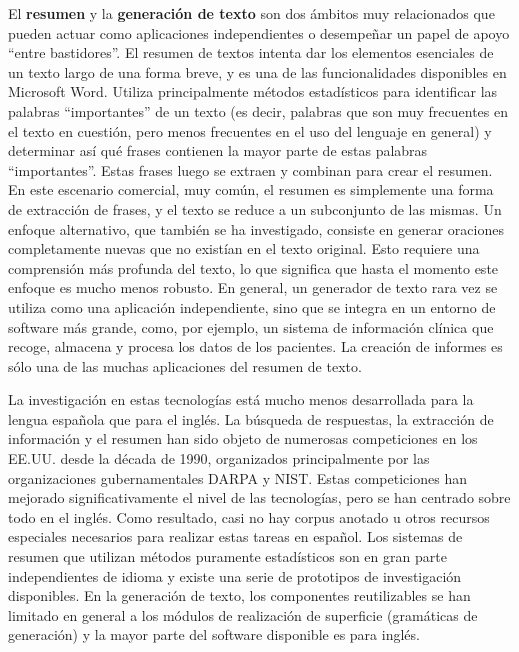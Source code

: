 \begin{multicols}{2}

El \textbf{resumen} y la \textbf{generación de texto} son dos ámbitos muy relacionados que pueden actuar como aplicaciones independientes o desempeñar un papel de apoyo ``entre bastidores''. El resumen de textos intenta dar los elementos esenciales de un texto largo de una forma breve, y es una de las funcionalidades disponibles en Microsoft Word. Utiliza principalmente métodos estadísticos para identificar las palabras ``importantes'' de un texto (es decir, palabras que son muy frecuentes en el texto en cuestión, pero menos frecuentes en el uso del lenguaje en general) y determinar así qué frases contienen la mayor parte de estas palabras ``importantes''. Estas frases luego se extraen y combinan para crear el resumen. En este escenario comercial, muy común, el resumen es simplemente una forma de extracción de frases, y el texto se reduce a un subconjunto de las mismas. Un enfoque alternativo, que también se ha investigado, consiste en generar oraciones completamente nuevas  que no existían en el texto original. Esto requiere una comprensión más profunda del texto, lo que significa que hasta el momento este enfoque es mucho menos robusto. En general, un generador de texto rara vez se utiliza como una aplicación independiente, sino que se integra en un entorno de software más grande, como, por ejemplo, un sistema de información clínica que recoge, almacena y procesa los datos de los pacientes. La creación de informes es sólo una de las muchas aplicaciones del resumen de texto.

La investigación en estas tecnologías está mucho menos desarrollada para la lengua española que para el inglés. La búsqueda de respuestas, la extracción de información y el resumen han sido objeto de numerosas competiciones en los EE.UU. desde la década de 1990, organizados principalmente por las organizaciones gubernamentales DARPA y NIST. Estas competiciones han mejorado significativamente el nivel de las tecnologías, pero se han centrado sobre todo en el inglés. Como resultado, casi no hay corpus anotado u otros recursos especiales necesarios para realizar estas tareas en español. Los sistemas de resumen que utilizan métodos puramente estadísticos son en gran parte independientes de idioma y existe una serie de prototipos de investigación disponibles. En la generación de texto, los componentes reutilizables se han limitado en general a los módulos de realización de superficie (gramáticas de generación) y la mayor parte del software disponible es para inglés.


\end{multicols}
